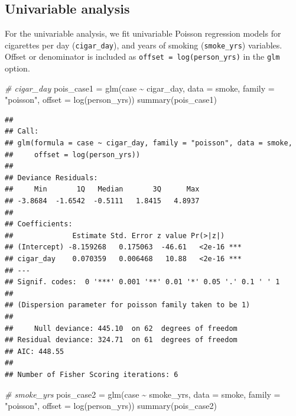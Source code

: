 \documentclass[
  10pt,
]{krantz}
\newenvironment{Shaded}{\begin{snugshade}}{\end{snugshade}}
\newcommand{\AttributeTok}[1]{\textcolor[rgb]{0.77,0.63,0.00}{#1}}
\newcommand{\CommentTok}[1]{\textcolor[rgb]{0.56,0.35,0.01}{\textit{#1}}}
\newcommand{\FunctionTok}[1]{\textcolor[rgb]{0.00,0.00,0.00}{#1}}
\newcommand{\NormalTok}[1]{#1}
\newcommand{\OtherTok}[1]{\textcolor[rgb]{0.56,0.35,0.01}{#1}}
\newcommand{\SpecialCharTok}[1]{\textcolor[rgb]{0.00,0.00,0.00}{#1}}
\newcommand{\StringTok}[1]{\textcolor[rgb]{0.31,0.60,0.02}{#1}}
\begin{document}
\hypertarget{univariable-analysis-3}{%
\subsection{Univariable analysis}\label{univariable-analysis-3}}

For the univariable analysis, we fit univariable Poisson regression models for cigarettes per day (\texttt{cigar\_day}), and years of smoking (\texttt{smoke\_yrs}) variables. Offset or denominator is included as \texttt{offset\ =\ log(person\_yrs)} in the \texttt{glm} option.

\begin{Shaded}
\begin{Highlighting}[]
\CommentTok{\# cigar\_day}
\NormalTok{pois\_case1 }\OtherTok{=} \FunctionTok{glm}\NormalTok{(case }\SpecialCharTok{\textasciitilde{}}\NormalTok{ cigar\_day, }\AttributeTok{data =}\NormalTok{ smoke, }\AttributeTok{family =} \StringTok{"poisson"}\NormalTok{, }
                 \AttributeTok{offset =} \FunctionTok{log}\NormalTok{(person\_yrs))}
\FunctionTok{summary}\NormalTok{(pois\_case1)}
\end{Highlighting}
\end{Shaded}

\begin{verbatim}
## 
## Call:
## glm(formula = case ~ cigar_day, family = "poisson", data = smoke, 
##     offset = log(person_yrs))
## 
## Deviance Residuals: 
##     Min       1Q   Median       3Q      Max  
## -3.8684  -1.6542  -0.5111   1.8415   4.8937  
## 
## Coefficients:
##              Estimate Std. Error z value Pr(>|z|)    
## (Intercept) -8.159268   0.175063  -46.61   <2e-16 ***
## cigar_day    0.070359   0.006468   10.88   <2e-16 ***
## ---
## Signif. codes:  0 '***' 0.001 '**' 0.01 '*' 0.05 '.' 0.1 ' ' 1
## 
## (Dispersion parameter for poisson family taken to be 1)
## 
##     Null deviance: 445.10  on 62  degrees of freedom
## Residual deviance: 324.71  on 61  degrees of freedom
## AIC: 448.55
## 
## Number of Fisher Scoring iterations: 6
\end{verbatim}

\begin{Shaded}
\begin{Highlighting}[]
\CommentTok{\# smoke\_yrs}
\NormalTok{pois\_case2 }\OtherTok{=} \FunctionTok{glm}\NormalTok{(case }\SpecialCharTok{\textasciitilde{}}\NormalTok{ smoke\_yrs, }\AttributeTok{data =}\NormalTok{ smoke, }\AttributeTok{family =} \StringTok{"poisson"}\NormalTok{, }
                 \AttributeTok{offset =} \FunctionTok{log}\NormalTok{(person\_yrs))}
\FunctionTok{summary}\NormalTok{(pois\_case2)}
\end{Highlighting}
\end{Shaded}
\end{document}
